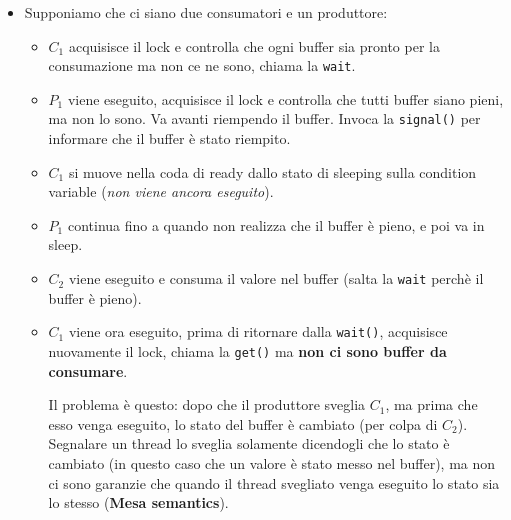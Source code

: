 \documentclass[12pt, twoside, letterpaper]{article}
\begin{document}
				\begin{itemize}
					\item Supponiamo che ci siano due consumatori e un produttore:
					\begin{itemize}
						\item $C_1$ acquisisce il lock e controlla che ogni buffer sia pronto per la consumazione ma non ce ne sono, chiama la \texttt{wait}. 
						\item $P_1$ viene eseguito, acquisisce il lock e controlla che tutti buffer siano pieni, ma non lo sono. Va avanti riempendo il buffer. Invoca la \texttt{signal()} per informare che il buffer è stato riempito.
						\item $C_1$ si muove nella coda di ready dallo stato di sleeping sulla condition variable (\textit{non viene ancora eseguito}). 
						\item $P_1$ continua fino a quando non realizza che il buffer è pieno, e poi va in sleep.
						\item $C_2$ viene eseguito e consuma il valore nel buffer (salta la \texttt{wait} perchè il buffer è pieno).
						\item $C_1$ viene ora eseguito, prima di ritornare dalla \texttt{wait()}, acquisisce nuovamente il lock, chiama la \texttt{get()} ma \textbf{non ci sono buffer da consumare}.
						
						Il problema è questo: dopo che il produttore sveglia $C_1$, ma prima che esso venga eseguito, lo stato del buffer è cambiato (per colpa di $C_2$). Segnalare un thread lo sveglia solamente dicendogli che lo stato è cambiato (in questo caso che un valore è stato messo nel buffer), ma non ci sono garanzie che quando il thread svegliato venga eseguito lo stato sia lo stesso (\textbf{Mesa semantics}). 
						

\end{itemize}
\end{itemize}
\end{document}
